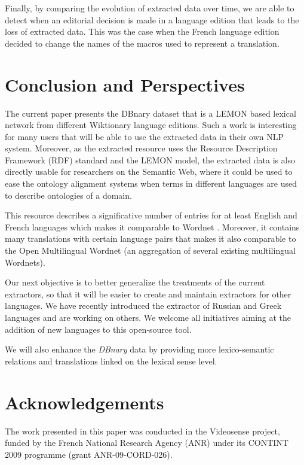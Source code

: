 \documentclass[sw]{iosart2c}
\begin{document}
Finally, by comparing the evolution of extracted data over time, we are able to detect when an editorial decision is made in a language edition that leads to the loss of extracted data. This was the case when the French language edition decided to change the names of the macros used to represent a translation. 

\section{Conclusion and Perspectives}

The current paper presents the DBnary dataset that is a LEMON based lexical network from different Wiktionary language editions. Such a work is interesting for many users that will be able to use the extracted data in their own NLP system. Moreover, as the extracted resource uses the Resource Description Framework (RDF) standard and the LEMON model, the extracted data is also directly usable for researchers on the Semantic Web, where it could be used to ease the ontology alignment systems when terms in different languages are used to describe ontologies of a domain.

This resource describes a significative number of entries for at least English and French languages which makes it comparable to Wordnet \cite{wordnet-fellbaum}. Moreover, it contains many translations with certain language pairs that makes it also comparable to the Open Multilingual Wordnet \cite{DBLP:conf/acl/BondF13} (an aggregation of several existing multilingual Wordnets).

Our next objective is to better generalize the treatments of the current extractors, so that it will be easier to create and maintain extractors for other languages. We have recently introduced the extractor of Russian and Greek languages and are working on others. We welcome all initiatives aiming at the addition of new languages to this open-source tool. 

We will also enhance the \textit{DBnary} data by providing more lexico-semantic relations and translations linked on the lexical sense level.

\section{Acknowledgements}

The work presented in this paper was conducted in the Videosense project, funded by the French National Research Agency (ANR) under its CONTINT 2009 programme (grant ANR-09-CORD-026).

   



\end{document}
